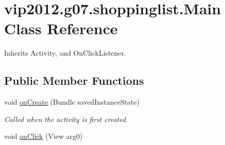 \hypertarget{classvip2012_1_1g07_1_1shoppinglist_1_1Main}{\section{vip2012.\-g07.\-shoppinglist.\-Main Class Reference}
\label{dd/dee/classvip2012_1_1g07_1_1shoppinglist_1_1Main}
}


Inherits Activity, and On\-Click\-Listener.

\subsection*{Public Member Functions}
\begin{DoxyCompactItemize}
\item 
void \hyperlink{classvip2012_1_1g07_1_1shoppinglist_1_1Main_aef8afba4937dce29fd866ff57f9e937f}{on\-Create} (Bundle saved\-Instance\-State)
\begin{DoxyCompactList}\small\item\em Called when the activity is first created. \end{DoxyCompactList}\item 
void \hyperlink{classvip2012_1_1g07_1_1shoppinglist_1_1Main_aee5a22657cfcd2c0edb3ea648d9ed6fc}{on\-Click} (View arg0)
\end{DoxyCompactItemize}


